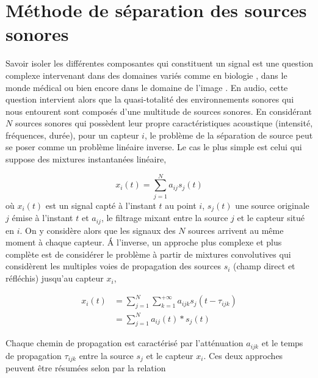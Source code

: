 %
%
%
%
%

\chapter{Méthode de séparation des sources sonores}
\label{chap:methode_separation_source}


Savoir isoler les différentes composantes qui constituent un signal est une question complexe intervenant dans des domaines variés comme en biologie \cite{chiappetta2004blind}, dans le monde médical \cite{jung2000removing} ou bien encore dans le domaine de l'image \cite{nuzillard2000blind}. En audio, cette question intervient alors que la quasi-totalité des environnements sonores qui nous entourent sont composés d'une multitude de sources sonores. En considérant $N$ sources sonores qui possèdent leur propre caractéristiques acoustique (intensité, fréquences, durée), pour un capteur $i$, le problème de la séparation de source peut se poser comme un problème linéaire inverse. Le cas le plus simple est celui qui suppose des mixtures instantanées linéaire, 

\begin{equation}
x_i(t) = \sum_{j = 1}^{N} a_{ij}s_j(t)
\end{equation}
où $x_i(t)$ est un signal capté à l'instant $t$ au point $i$, $s_j(t)$ une source originale $j$ émise à l'instant $t$ et $a_{ij}$, le filtrage mixant entre la source $j$ et le capteur situé en $i$. On y considère alors que les signaux des $N$ sources arrivent au même moment à chaque capteur. \'A l'inverse, un approche plus complexe et plus complète est de considérer le problème à partir de mixtures convolutives qui considèrent les multiples voies de propagation des sources $s_i$ (champ direct et réfléchis) jusqu'au capteur $x_i$,  

\begin{subequations}
\begin{align}
x_i(t) &= \sum_{j = 1}^{N} \sum_{k = 1}^{+\infty} a_{ijk} s_j(t-\tau_{ijk})\\
 &= \sum_{j = 1}^{N} a_{ij}(t) \ast s_j(t)\label{eq:BSS_convol}
\end{align}
\end{subequations}

Chaque chemin de propagation est caractérisé par l'atténuation $a_{ijk}$ et le temps de propagation $\tau_{ijk}$ entre la source $s_j$ et le capteur $x_i$. Ces deux approches peuvent être résumées selon \cite{cardoso_blind_1998} par la relation  

